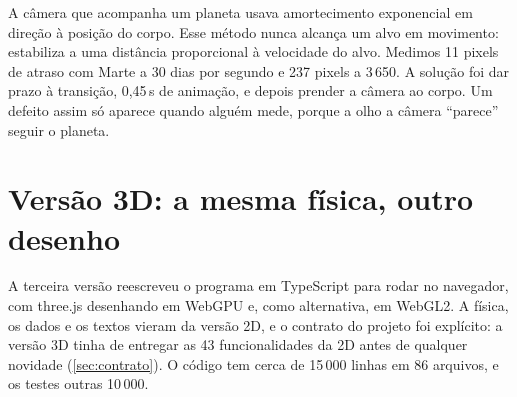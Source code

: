 \begin{licao}
A câmera que acompanha um planeta usava amortecimento exponencial em direção à posição do corpo. Esse método nunca alcança um alvo em movimento: estabiliza a uma distância proporcional à velocidade do alvo. Medimos 11 pixels de atraso com Marte a 30 dias por segundo e 237 pixels a 3\,650. A solução foi dar prazo à transição, 0,45\,s de animação, e depois prender a câmera ao corpo. Um defeito assim só aparece quando alguém mede, porque a olho a câmera ``parece'' seguir o planeta.
\end{licao}

\section{Versão 3D: a mesma física, outro desenho}\label{sec:v3d}

A terceira versão reescreveu o programa em TypeScript para rodar no navegador, com three.js \cite{threejs} desenhando em WebGPU \cite{webgpu} e, como alternativa, em WebGL2. A física, os dados e os textos vieram da versão 2D, e o contrato do projeto foi explícito: a versão 3D tinha de entregar as 43 funcionalidades da 2D antes de qualquer novidade (\autoref{sec:contrato}). O código tem cerca de 15\,000 linhas em 86 arquivos, e os testes outras 10\,000.

